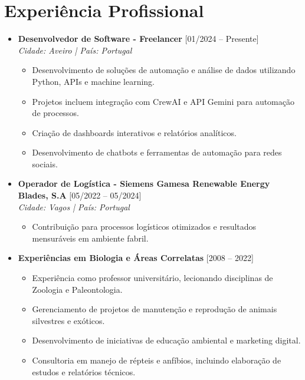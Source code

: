 \documentclass[11pt]{article}
\begin{document}
\section*{Experiência Profissional}
\begin{itemize}
    \item \textbf{Desenvolvedor de Software - Freelancer} [01/2024 – Presente] \\
    \textit{Cidade: Aveiro | País: Portugal}
    \begin{itemize}
        \item Desenvolvimento de soluções de automação e análise de dados utilizando Python, APIs e machine learning.
        \item Projetos incluem integração com CrewAI e API Gemini para automação de processos.
        \item Criação de dashboards interativos e relatórios analíticos.
        \item Desenvolvimento de chatbots e ferramentas de automação para redes sociais.
    \end{itemize}
    \item \textbf{Operador de Logística - Siemens Gamesa Renewable Energy Blades, S.A} [05/2022 – 05/2024] \\
    \textit{Cidade: Vagos | País: Portugal}
    \begin{itemize}
        \item Contribuição para processos logísticos otimizados e resultados mensuráveis em ambiente fabril.
    \end{itemize}
    \item \textbf{Experiências em Biologia e Áreas Correlatas} [2008 – 2022]
    \begin{itemize}
        \item Experiência como professor universitário, lecionando disciplinas de Zoologia e Paleontologia.
        \item Gerenciamento de projetos de manutenção e reprodução de animais silvestres e exóticos.
        \item Desenvolvimento de iniciativas de educação ambiental e marketing digital.
        \item Consultoria em manejo de répteis e anfíbios, incluindo elaboração de estudos e relatórios técnicos.
    \end{itemize}
\end{itemize}

\end{document}
